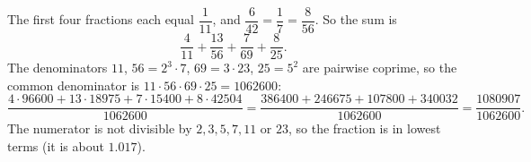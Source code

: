 The first four fractions each equal $\dfrac{1}{11}$, and $\dfrac{6}{42}=\dfrac17=\dfrac{8}{56}$. So the sum is
\[\dfrac{4}{11}+\dfrac{13}{56}+\dfrac{7}{69}+\dfrac{8}{25}.\]
The denominators $11$, $56=2^3\cdot7$, $69=3\cdot23$, $25=5^2$ are pairwise coprime, so the common denominator is $11\cdot56\cdot69\cdot25=1062600$:
\[\dfrac{4\cdot96600+13\cdot18975+7\cdot15400+8\cdot42504}{1062600}=\dfrac{386400+246675+107800+340032}{1062600}=\boxed{\dfrac{1080907}{1062600}}.\]
The numerator is not divisible by $2,3,5,7,11$ or $23$, so the fraction is in lowest terms (it is about $1.017$).
